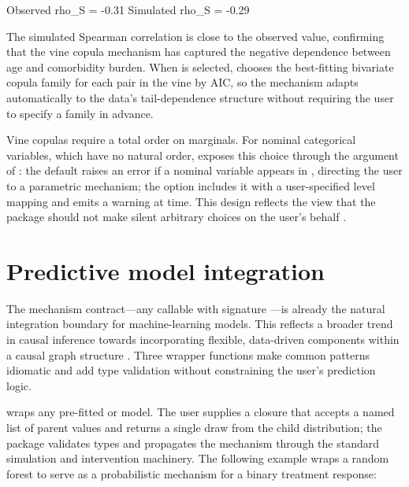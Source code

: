 \documentclass[article]{jss}
\begin{document}
\begin{CodeOutput}
Observed rho_S = -0.31   Simulated rho_S = -0.29
\end{CodeOutput}

\noindent
The simulated Spearman correlation is close to the observed value, confirming that
the vine copula mechanism has captured the negative dependence between age and
comorbidity burden. When  is selected, 
chooses the best-fitting bivariate copula family for each pair in the vine by AIC,
so the mechanism adapts automatically to the data's tail-dependence structure
without requiring the user to specify a family in advance.

Vine copulas require a total order on marginals. For nominal categorical variables,
which have no natural order,  exposes this choice through the
 argument of : the default
 raises an error if a nominal variable appears in
, directing the user to a parametric mechanism; the
 option includes it with a user-specified level mapping
and emits a warning at  time. This design reflects the
view that the package should not make silent arbitrary choices on the user's behalf
\citep{pearl2009causality}.

\section{Predictive model integration}
\label{sec:models}

The mechanism contract---any callable with signature
---is already the natural integration
boundary for machine-learning models. This reflects a broader trend in causal
inference towards incorporating flexible, data-driven components within a causal
graph structure \citep{scholkopf2021causal, peters2017elements}. Three wrapper
functions make common patterns idiomatic and add type validation without
constraining the user's prediction logic.

 wraps any pre-fitted  or 
model. The user supplies a  closure that accepts a named list of
parent values and returns a single draw from the child distribution; the package
validates types and propagates the mechanism through the standard simulation and
intervention machinery. The following example wraps a  random forest
\citep{wright2017ranger, breiman2001random} to serve as a probabilistic mechanism
for a binary treatment response:
\end{document}
